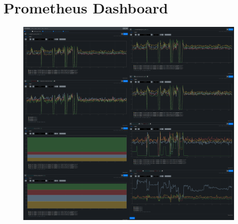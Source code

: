{\let\clearpage\relax\chapter{Prometheus Dashboard}\label{appendix:prometheus-dashboard}}

\begin{figure}[H]
    \includegraphics[width=16.5cm]{assets/appendix/prometheus-dashboard.png}
\end{figure}